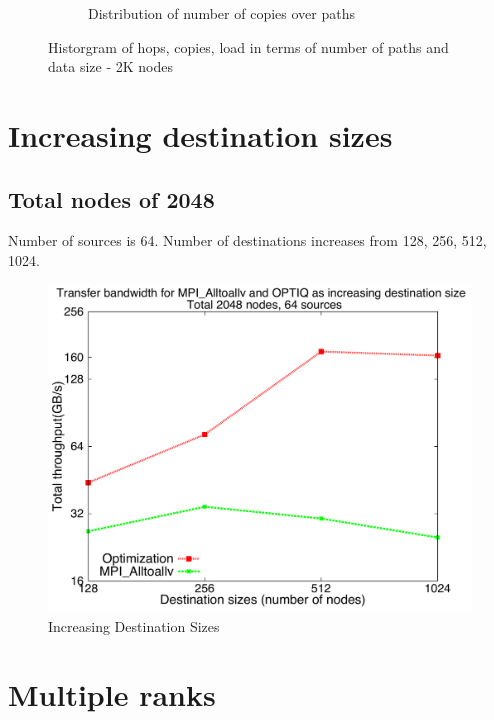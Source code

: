 \documentclass[letter]{article}
\begin{document}
\begin{figure}[!htbp]
\begin{subfigure}[b]{0.49\textwidth}
                \caption{Distribution of number of copies over paths}
                \label{fig:incrdist_2k_hopcopy}
        \end{subfigure}
        \caption{Historgram of hops, copies, load in terms of number of paths and data size - 2K nodes}
        \label{fig:incrdist_2k_histo}
\end{figure}

\clearpage
\newpage

\section {Increasing destination sizes}

\subsection{Total nodes of 2048}

Number of sources is 64. Number of destinations increases from 128, 256, 512, 1024. 

\begin{figure}[h]
\vspace{-0.1in}
\centering
\includegraphics[scale=0.40]{report_figures/incrsize/incrsize_2k.pdf}
\vspace{-0.1in}
\caption{Increasing Destination Sizes}
\vspace{-0.1in}
\label{fig:incrsize_2k}
\end{figure}

\section{Multiple ranks}
\end{document}
